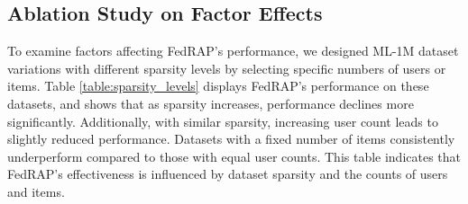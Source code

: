 \documentclass{article} %
\begin{document}

\subsection{Ablation Study on Factor Effects}

To examine factors affecting FedRAP's performance, we designed ML-1M dataset variations with different sparsity levels by selecting specific numbers of users or items. Table \ref{table:sparsity_levels} displays FedRAP's performance on these datasets, and shows that as sparsity increases, performance declines more significantly. Additionally, with similar sparsity, increasing user count leads to slightly reduced performance. Datasets with a fixed number of items consistently underperform compared to those with equal user counts. This table indicates that FedRAP's effectiveness is influenced by dataset sparsity and the counts of users and items.
\end{document}
